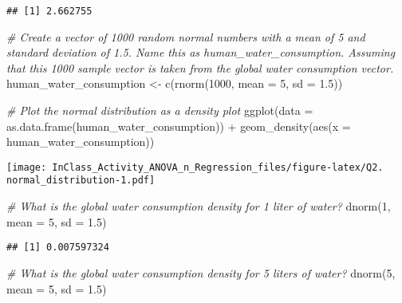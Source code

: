 \documentclass[
]{article}
\newenvironment{Shaded}{\begin{snugshade}}{\end{snugshade}}
\newcommand{\AttributeTok}[1]{\textcolor[rgb]{0.77,0.63,0.00}{#1}}
\newcommand{\CommentTok}[1]{\textcolor[rgb]{0.56,0.35,0.01}{\textit{#1}}}
\newcommand{\DecValTok}[1]{\textcolor[rgb]{0.00,0.00,0.81}{#1}}
\newcommand{\FloatTok}[1]{\textcolor[rgb]{0.00,0.00,0.81}{#1}}
\newcommand{\FunctionTok}[1]{\textcolor[rgb]{0.00,0.00,0.00}{#1}}
\newcommand{\NormalTok}[1]{#1}
\newcommand{\OtherTok}[1]{\textcolor[rgb]{0.56,0.35,0.01}{#1}}
\newcommand{\SpecialCharTok}[1]{\textcolor[rgb]{0.00,0.00,0.00}{#1}}
\begin{document}
\begin{verbatim}
## [1] 2.662755
\end{verbatim}

\begin{Shaded}
\begin{Highlighting}[]
\CommentTok{\# Create a vector of 1000 random normal numbers with a mean of 5 and standard deviation of 1.5. Name this as human\_water\_consumption. Assuming that this 1000 sample vector is taken from the global water consumption vector.  }
\NormalTok{human\_water\_consumption }\OtherTok{\textless{}{-}} \FunctionTok{c}\NormalTok{(}\FunctionTok{rnorm}\NormalTok{(}\DecValTok{1000}\NormalTok{, }\AttributeTok{mean =} \DecValTok{5}\NormalTok{, }\AttributeTok{sd =} \FloatTok{1.5}\NormalTok{))}

\CommentTok{\# Plot the normal distribution as a density plot}
\FunctionTok{ggplot}\NormalTok{(}\AttributeTok{data =} \FunctionTok{as.data.frame}\NormalTok{(human\_water\_consumption)) }\SpecialCharTok{+}
  \FunctionTok{geom\_density}\NormalTok{(}\FunctionTok{aes}\NormalTok{(}\AttributeTok{x =}\NormalTok{ human\_water\_consumption))}
\end{Highlighting}
\end{Shaded}

\texttt{[image: InClass\_Activity\_ANOVA\_n\_Regression\_files/figure-latex/Q2. normal\_distribution-1.pdf]}

\begin{Shaded}
\begin{Highlighting}[]
\CommentTok{\# What is the global water consumption density for 1 liter of water? }
\FunctionTok{dnorm}\NormalTok{(}\DecValTok{1}\NormalTok{,  }\AttributeTok{mean =} \DecValTok{5}\NormalTok{, }\AttributeTok{sd =} \FloatTok{1.5}\NormalTok{)}
\end{Highlighting}
\end{Shaded}

\begin{verbatim}
## [1] 0.007597324
\end{verbatim}

\begin{Shaded}
\begin{Highlighting}[]
\CommentTok{\# What is the global water consumption density for 5 liters of water? }
\FunctionTok{dnorm}\NormalTok{(}\DecValTok{5}\NormalTok{,  }\AttributeTok{mean =} \DecValTok{5}\NormalTok{, }\AttributeTok{sd =} \FloatTok{1.5}\NormalTok{)}
\end{Highlighting}
\end{Shaded}
\end{document}
